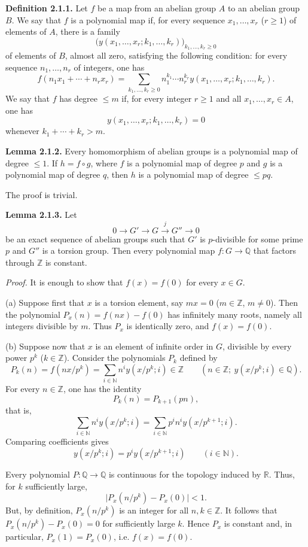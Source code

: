 \textbf{Definition 2.1.1.}
Let $f$ be a map from an abelian group $A$ to an abelian group $B$. We say
that $f$ is a polynomial map if, for every sequence $x_1,\ldots,x_r$
($r\geq1$) of elements of $A$, there is a family
\[
\bigl(y(x_1,\ldots,x_r;k_1,\ldots,k_r)\bigr)_{k_1,\ldots,k_r\geq0}
\]
of elements of $B$, almost all zero, satisfying the following condition: for
every sequence $n_1,\ldots,n_r$ of integers, one has
\[
f(n_1x_1+\cdots+n_rx_r)=
\sum_{k_1,\ldots,k_r\geq0}
n_1^{k_1}\cdots n_r^{k_r}
y(x_1,\ldots,x_r;k_1,\ldots,k_r).
\]
We say that $f$ has degree $\leq m$ if, for every integer $r\geq1$ and all
$x_1,\ldots,x_r\in A$, one has
\[
y(x_1,\ldots,x_r;k_1,\ldots,k_r)=0
\]
whenever $k_1+\cdots+k_r>m$.

\textbf{Lemma 2.1.2.}
Every homomorphism of abelian groups is a polynomial map of degree $\leq1$.
If $h=f\circ g$, where $f$ is a polynomial map of degree $p$ and $g$ is a
polynomial map of degree $q$, then $h$ is a polynomial map of degree
$\leq pq$.

The proof is trivial.

\textbf{Lemma 2.1.3.}
Let
\[
0\longrightarrow G'\longrightarrow G\xrightarrow{j}G''\longrightarrow0
\]
be an exact sequence of abelian groups such that $G'$ is $p$-divisible for
some prime $p$ and $G''$ is a torsion group. Then every polynomial map
$f:G\to\mathbb Q$ that factors through $\mathbb Z$ is constant.

\emph{Proof.}
It is enough to show that $f(x)=f(0)$ for every $x\in G$.

(a) Suppose first that $x$ is a torsion element, say $mx=0$
($m\in\mathbb Z$, $m\ne0$). Then the polynomial
$P_x(n)=f(nx)-f(0)$ has infinitely many roots, namely all integers divisible
by $m$. Thus $P_x$ is identically zero, and $f(x)=f(0)$.

(b) Suppose now that $x$ is an element of infinite order in $G$, divisible by every power
$p^k$ ($k\in\mathbb Z$). Consider the polynomials $P_k$ defined by
\[
P_k(n)=f(nx/p^k)=\sum_{i\in\mathbb N}n^iy(x/p^k;i)\in\mathbb Z
\qquad(n\in\mathbb Z;\ y(x/p^k;i)\in\mathbb Q).
\]
For every $n\in\mathbb Z$, one has the identity
\[
P_k(n)=P_{k+1}(pn),
\]
that is,
\[
\sum_{i\in\mathbb N}n^iy(x/p^k;i)=
\sum_{i\in\mathbb N}p^in^iy(x/p^{k+1};i).
\]
Comparing coefficients gives
\[
y(x/p^k;i)=p^iy(x/p^{k+1};i)\qquad(i\in\mathbb N).
\]

Every polynomial $P:\mathbb Q\to\mathbb Q$ is continuous for the topology
induced by $\mathbb R$. Thus, for $k$ sufficiently large,
\[
\lvert P_x(n/p^k)-P_x(0)\rvert<1.
\]
But, by definition, $P_x(n/p^k)$ is an integer for all
$n,k\in\mathbb Z$. It follows that $P_x(n/p^k)-P_x(0)=0$ for sufficiently
large $k$. Hence $P_x$ is constant and, in particular,
$P_x(1)=P_x(0)$, i.e. $f(x)=f(0)$.

